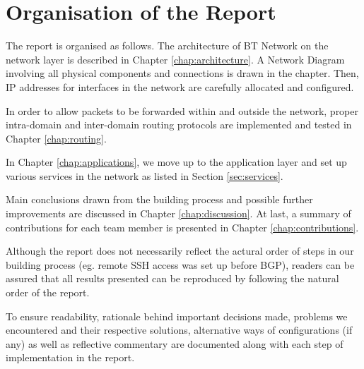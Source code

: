 \section{Organisation of the Report}
\label{sec:organisation}

The report is organised as follows. The architecture of BT Network on the network layer is described in Chapter \ref{chap:architecture}. A Network Diagram involving all physical components and connections is drawn in the chapter. Then, IP addresses for interfaces in the network are carefully allocated and configured. 

In order to allow packets to be forwarded within and outside the network, proper intra-domain and inter-domain routing protocols are implemented and tested in Chapter \ref{chap:routing}. 

In Chapter \ref{chap:applications}, we move up to the application layer and set up various services in the network as listed in Section \ref{sec:services}.

Main conclusions drawn from the building process and possible further improvements are discussed in Chapter \ref{chap:discussion}. At last, a summary of contributions for each team member is presented in Chapter \ref{chap:contributions}.

Although the report does not necessarily reflect the actural order of steps in our building process (eg. remote SSH access was set up before BGP), readers can be assured that all results presented can be reproduced by following the natural order of the report.

To ensure readability, rationale behind important decisions made, problems we encountered and their respective solutions, alternative ways of configurations (if any) as well as reflective commentary are documented along with each step of implementation in the report.
